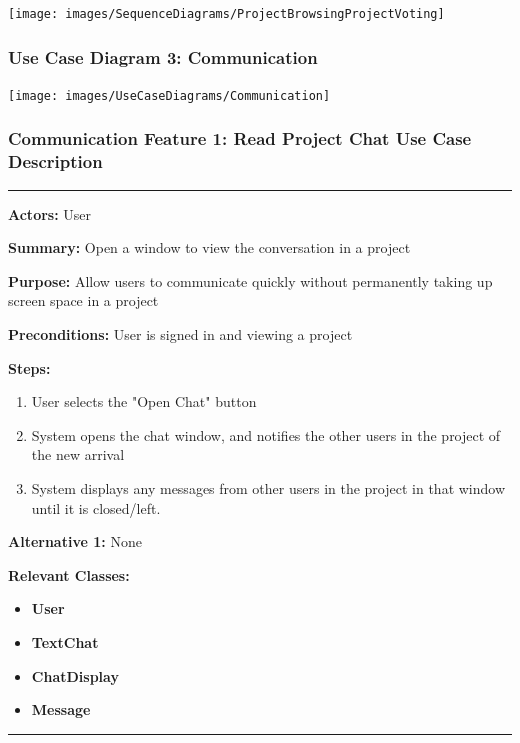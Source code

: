\documentclass[twoside,letterpaper]{article}
\begin{document}
\texttt{[image: images/SequenceDiagrams/ProjectBrowsingProjectVoting]}

\newpage

\subsubsection[Use Case Diagram 3: Communication]{\rmfamily\bfseries\color{black}
	Use Case Diagram 3: Communication}

\texttt{[image: images/UseCaseDiagrams/Communication]}

\newpage

\subsubsection[Communication Feature 1: Read Project Chat Use Case Description]{\rmfamily\bfseries\color{black}
	Communication Feature 1: Read Project Chat Use Case Description}
\hypertarget{RefHeading22059017292}{}

\vspace{2pt}
\hrule
\vspace{8pt}
\textbf{Actors:} User \newline

\noindent\textbf{Summary:} Open a window to view the conversation in a project  \newline

\noindent\textbf{Purpose:} Allow users to communicate quickly without permanently taking up screen space in a project \newline

\noindent\textbf{Preconditions:} User is signed in and viewing a project \newline

\noindent\textbf{Steps:} \begin{enumerate}
	\item User selects the "Open Chat" button
	\item System opens the chat window, and notifies the other users in the project of the new arrival
	\item System displays any messages from other users in the project in that window until it is closed/left.
\end{enumerate}
\noindent\textbf{Alternative 1:} None \newline


\noindent\textbf{Relevant Classes:}
\begin{itemize}
	\item \textbf{User}
	\item \textbf{TextChat}
	\item \textbf{ChatDisplay}
	\item \textbf{Message}
\end{itemize}
\hrule
\newpage
\end{document}
